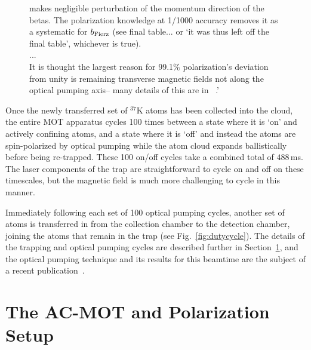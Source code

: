 \begin{figure}[h!!]
{makes negligible perturbation of the momentum direction of the betas.
The polarization knowledge at 1/1000 accuracy removes it as a systematic for $b_{\mathrm{Fierz}}$ (see final table... or `it was thus left off the final table', whichever is true).
\\...\\
It is thought the largest reason for 99.1\% polarization's deviation from unity
is remaining transverse magnetic fields not along the optical pumping axis-- many details of this are in ~\cite{thesis}.'
	}
\end{figure}

Once the newly transferred set of $^{37}\textrm{K}$ atoms has been collected into the cloud, the entire MOT apparatus cycles 100 times between a state where it is `on' and actively confining atoms, and a state where it is `off' and instead the atoms are spin-polarized by optical pumping while the atom cloud expands ballistically before being re-trapped.  These 100 on/off cycles take a combined total of $488\,$ms.  The laser components of the trap are straightforward to cycle on and off on these timescales, but the magnetic field is much more challenging to cycle in this manner.  

Immediately following each set of 100 optical pumping cycles, another set of atoms is transferred in from the collection chamber to the detection chamber, joining the atoms that remain in the trap (see Fig.~\ref{fig:dutycycle}).  The details of the trapping and optical pumping cycles are described further in Section~\ref{section:acmot_and_polarization}, and the optical pumping technique and its results for this beamtime are the subject of a recent publication~\cite{ben_OP}.




{
	\pagebreak
}
{}

\section{The AC-MOT and Polarization Setup}
\label{section:acmot_and_polarization}

